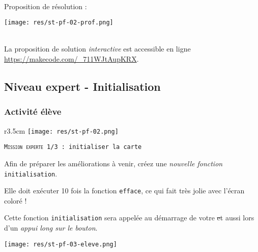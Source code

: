 \newpage

\begin{minipage}[t]{0.8\linewidth}
    \begin{methode}~\\
    Proposition de résolution :
    
    \centerline{\texttt{[image: res/st-pf-02-prof.png]}}
    \end{methode}
\end{minipage}
\hfill
\begin{minipage}[t]{0.2\linewidth}
    \begin{remarque}~\\
        La proposition de solution \emph{interactive} est accessible en ligne \url{https://makecode.com/_711WJtAupKRX}.
    \end{remarque}
\end{minipage}
%
%
\newpage
\subsection{Niveau expert - Initialisation}
\subsubsection{Activité élève}



%
%
\begin{wrapfigure}[3]{r}{3.5cm}
    \texttt{[image: res/st-pf-02.png]}
\end{wrapfigure}

\begin{eleve}    
    \texttt{\textsc{Mission experte 1/3} : initialiser la carte}
    
    
    \begin{minipage}[t]{0.2\linewidth}
        Afin de préparer les améliorations à venir, créez une \emph{nouvelle fonction} \texttt{initialisation}.
        
        Elle doit exécuter 10 fois la fonction \texttt{efface}, ce qui fait très jolie avec l'écran coloré !
        
        Cette fonction \texttt{initialisation} sera appelée au démarrage de votre \st et aussi lors d'un \emph{appui long sur le bouton}.
    \end{minipage}
    \hfill
    \begin{minipage}[t]{0.75\linewidth}
        \vspace{0pt}
        \centerline{
            \texttt{[image: res/st-pf-03-eleve.png]}}
    \end{minipage}
    

\end{eleve}

